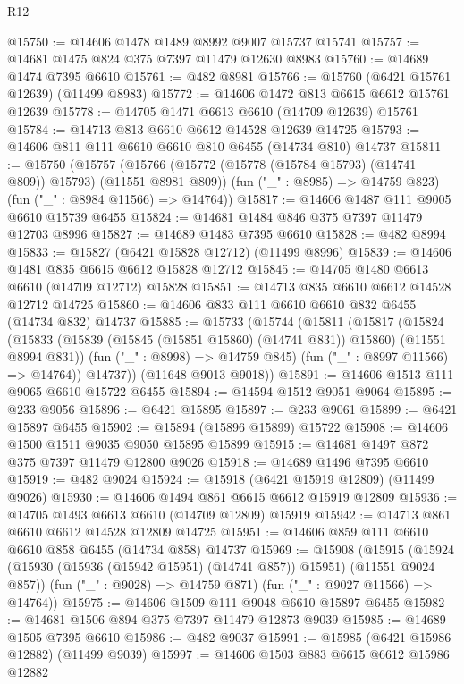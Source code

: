 \begin{lexlean}{R12}
\begin{coremodule}
{{{{{{{{{{{{{{{{{{{{{{{{{{{{{{{{{{{{{{{{{{{{{{{{{{{{{{{{{{{{{{{{{{{{{{{{{{{{{{{{{{@15750 := @14606 @1478 @1489 @8992 @9007 @15737 @15741
@15757 := @14681 @1475 @824 @375 @7397 @11479 @12630 @8983
@15760 := @14689 @1474 @7395 @6610
@15761 := @482 @8981
@15766 := @15760 (@6421 @15761 @12639) (@11499 @8983)
@15772 := @14606 @1472 @813 @6615 @6612 @15761 @12639
@15778 := @14705 @1471 @6613 @6610 (@14709 @12639) @15761
@15784 := @14713 @813 @6610 @6612 @14528 @12639 @14725
@15793 := @14606 @811 @111 @6610 @6610 @810 @6455 (@14734 @810) @14737
@15811 := @15750
    (@15757
      (@15766 (@15772 (@15778 (@15784 @15793) (@14741 @809)) @15793) (@11551 @8981 @809))
      (fun ("_" : @8985) => @14759 @823)
      (fun ("_" : @8984 @11566) => @14764))
@15817 := @14606 @1487 @111 @9005 @6610 @15739 @6455
@15824 := @14681 @1484 @846 @375 @7397 @11479 @12703 @8996
@15827 := @14689 @1483 @7395 @6610
@15828 := @482 @8994
@15833 := @15827 (@6421 @15828 @12712) (@11499 @8996)
@15839 := @14606 @1481 @835 @6615 @6612 @15828 @12712
@15845 := @14705 @1480 @6613 @6610 (@14709 @12712) @15828
@15851 := @14713 @835 @6610 @6612 @14528 @12712 @14725
@15860 := @14606 @833 @111 @6610 @6610 @832 @6455 (@14734 @832) @14737
@15885 := @15733
    (@15744
      (@15811
        (@15817
          (@15824
            (@15833 (@15839 (@15845 (@15851 @15860) (@14741 @831)) @15860) (@11551 @8994 @831))
            (fun ("_" : @8998) => @14759 @845)
            (fun ("_" : @8997 @11566) => @14764))
          @14737))
      (@11648 @9013 @9018))
@15891 := @14606 @1513 @111 @9065 @6610 @15722 @6455
@15894 := @14594 @1512 @9051 @9064
@15895 := @233 @9056
@15896 := @6421 @15895
@15897 := @233 @9061
@15899 := @6421 @15897 @6455
@15902 := @15894 (@15896 @15899) @15722
@15908 := @14606 @1500 @1511 @9035 @9050 @15895 @15899
@15915 := @14681 @1497 @872 @375 @7397 @11479 @12800 @9026
@15918 := @14689 @1496 @7395 @6610
@15919 := @482 @9024
@15924 := @15918 (@6421 @15919 @12809) (@11499 @9026)
@15930 := @14606 @1494 @861 @6615 @6612 @15919 @12809
@15936 := @14705 @1493 @6613 @6610 (@14709 @12809) @15919
@15942 := @14713 @861 @6610 @6612 @14528 @12809 @14725
@15951 := @14606 @859 @111 @6610 @6610 @858 @6455 (@14734 @858) @14737
@15969 := @15908
    (@15915
      (@15924 (@15930 (@15936 (@15942 @15951) (@14741 @857)) @15951) (@11551 @9024 @857))
      (fun ("_" : @9028) => @14759 @871)
      (fun ("_" : @9027 @11566) => @14764))
@15975 := @14606 @1509 @111 @9048 @6610 @15897 @6455
@15982 := @14681 @1506 @894 @375 @7397 @11479 @12873 @9039
@15985 := @14689 @1505 @7395 @6610
@15986 := @482 @9037
@15991 := @15985 (@6421 @15986 @12882) (@11499 @9039)
@15997 := @14606 @1503 @883 @6615 @6612 @15986 @12882
}}}}}}}}}}}}}}}}}}}}}}}}}}}}}}}}}}}}}}}}}}}}}}}}}}}}}}}}}}}}}}}}}}}}}}}}}}}}}}}}}}
\end{coremodule}
\end{lexlean}
